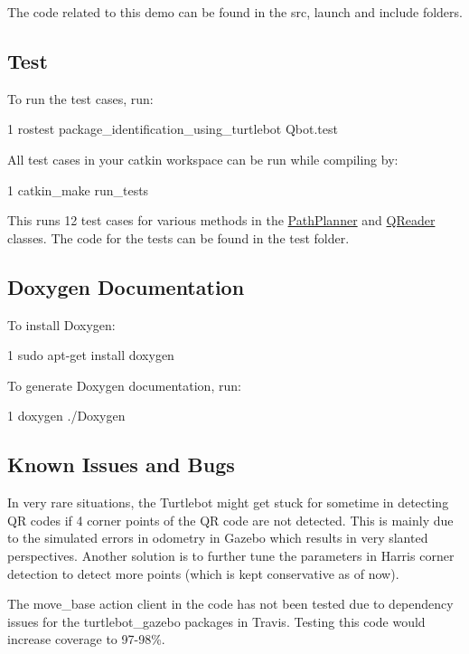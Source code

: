  

The code related to this demo can be found in the src, launch and include folders.

\subsection*{Test}

To run the test cases, run\+: 
\begin{DoxyCode}
1 rostest package\_identification\_using\_turtlebot Qbot.test
\end{DoxyCode}


All test cases in your catkin workspace can be run while compiling by\+: 
\begin{DoxyCode}
1 catkin\_make run\_tests
\end{DoxyCode}


This runs 12 test cases for various methods in the \hyperlink{classPathPlanner}{Path\+Planner} and \hyperlink{classQReader}{Q\+Reader} classes. The code for the tests can be found in the test folder.

\subsection*{Doxygen Documentation}

To install Doxygen\+: 
\begin{DoxyCode}
1 sudo apt-get install doxygen
\end{DoxyCode}
 To generate Doxygen documentation, run\+: 
\begin{DoxyCode}
1 doxygen ./Doxygen
\end{DoxyCode}


\subsection*{Known Issues and Bugs}


\begin{DoxyItemize}
\item In very rare situations, the Turtlebot might get stuck for sometime in detecting QR codes if 4 corner points of the QR code are not detected. This is mainly due to the simulated errors in odometry in Gazebo which results in very slanted perspectives. Another solution is to further tune the parameters in Harris corner detection to detect more points (which is kept conservative as of now).
\item The move\+\_\+base action client in the code has not been tested due to dependency issues for the turtlebot\+\_\+gazebo packages in Travis. Testing this code would increase coverage to 97-\/98\%.
\end{DoxyItemize}


